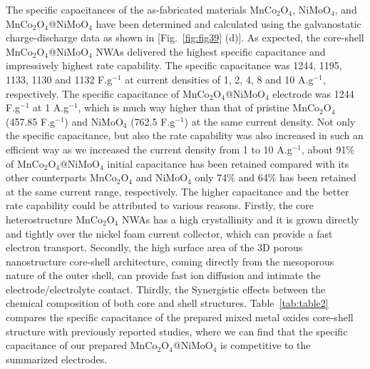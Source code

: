 \documentclass[reprint,amsmath,amssymb,aps,floatfix,
]{revtex4-2}
\begin{document}
The specific capacitances of the as-fabricated materials MnCo$_2$O$_4$, NiMoO$_4$, and MnCo$_2$O$_4$@NiMoO$_4$ have been determined and calculated using the galvanostatic charge-discharge data as shown in [Fig.~\ref{fig:fig39} (d)]. As expected, the core-shell MnCo$_2$O$_4$@NiMoO$_4$ NWAs delivered the highest specific capacitance and impressively highest rate capability. The specific capacitance was 1244, 1195, 1133, 1130 and 1132 F.g$^{-1}$ at current densities of 1, 2, 4, 8 and 10 A.g$^{-1}$, respectively. The specific capacitance of MnCo$_2$O$_4$@NiMoO$_4$ electrode was 1244 F.g$^{-1}$ at 1 A.g$^{-1}$, which is much way higher than that of pristine MnCo$_2$O$_4$ (457.85 F.g$^{-1}$) and NiMoO$_4$ (762.5 F.g$^{-1}$) at the same current density. Not only the specific capacitance, but also the rate capability was also increased in such an efficient way as we increased the current density from 1 to 10 A.g$^{-1}$, about 91\% of MnCo$_2$O$_4$@NiMoO$_4$ initial capacitance has been retained compared with its other counterparts MnCo$_2$O$_4$ and NiMoO$_4$ only 74\% and 64\% has been retained at the same current range, respectively. The higher capacitance and the better rate capability could be attributed to various reasons. Firstly, the core heterostructure MnCo$_2$O$_4$ NWAs has a high crystallinity and it is grown directly and tightly over the nickel foam current collector, which can provide a fast electron transport. Secondly, the high surface area of the 3D porous nanostructure core-shell architecture, coming directly from the mesoporous nature of the outer shell, can provide fast ion diffusion and intimate the electrode/electrolyte contact. Thirdly, the Synergistic effects between the chemical composition of both core and shell structures.\cite{Jeffrey2004} Table~\ref{tab:table2} compares the specific capacitance of the prepared mixed metal oxides core-shell structure with previously reported studies, where we can find that the specific capacitance of our prepared MnCo$_2$O$_4$@NiMoO$_4$ is competitive to the summarized electrodes.
\end{document}
